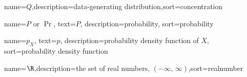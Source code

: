 



%
	{name=\ensuremath{Q},description={data-generating distribution},sort=concentration}





%
	{name={$P$ or $\Pr$}, text=\ensuremath{P}, description={probability}, sort=probability}

%
	{name={$p_X$}, text=\ensuremath{p}, description={probability density function of $X$}, sort={probability density function}}



%
	{name=\ensuremath{\R},description={the set of real numbers, $(-\infty,\,\infty)$},sort=realnumber}

